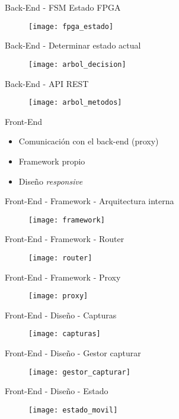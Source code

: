 \begin{frame}{Back-End - FSM Estado FPGA}
  \begin{figure}
    \texttt{[image: fpga\_estado]}
  \end{figure}
\end{frame}

\begin{frame}{Back-End - Determinar estado actual}
  \begin{figure}
    \texttt{[image: arbol\_decision]}
  \end{figure}
\end{frame}

\begin{frame}{Back-End - API REST}
  \begin{figure}
    \texttt{[image: arbol\_metodos]}
  \end{figure}
\end{frame}

\begin{frame}{Front-End}
  \begin{itemize}[<alert@+>]
    \item Comunicación con el back-end (proxy)
    \item Framework propio
    \item Diseño \textit{responsive}
  \end{itemize}
\end{frame}

\begin{frame}{Front-End - Framework - Arquitectura interna}
  \begin{figure}
    \texttt{[image: framework]}
  \end{figure}
\end{frame}

\begin{frame}{Front-End - Framework - Router}
  \begin{figure}
    \texttt{[image: router]}
  \end{figure}
\end{frame}

\begin{frame}{Front-End - Framework - Proxy}
  \begin{figure}
    \texttt{[image: proxy]}
  \end{figure}
\end{frame}

\begin{frame}{Front-End - Diseño - Capturas}
  \begin{figure}
    \texttt{[image: capturas]}
  \end{figure}
\end{frame}

\begin{frame}{Front-End - Diseño - Gestor capturar}
  \begin{figure}
    \texttt{[image: gestor\_capturar]}
  \end{figure}
\end{frame}

\begin{frame}{Front-End - Diseño - Estado}
  \begin{figure}
    \texttt{[image: estado\_movil]}
  \end{figure}
\end{frame}
